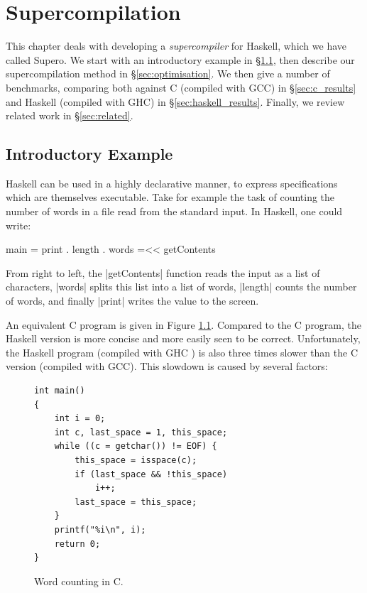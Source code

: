 
\chapter{Supercompilation}


This chapter deals with developing a \textit{supercompiler} for Haskell, which we have called Supero. We start with an introductory example in \S\ref{sec:intro_supero}, then describe our supercompilation method in \S\ref{sec:optimisation}. We then give a number of benchmarks, comparing both against C (compiled with GCC) in \S\ref{sec:c_results} and Haskell (compiled with GHC) in \S\ref{sec:haskell_results}. Finally, we review related work in \S\ref{sec:related}.

\section{Introductory Example}
\label{sec:intro_supero}

Haskell \cite{haskell} can be used in a highly declarative manner, to express specifications which are themselves executable. Take for example the task of counting the number of words in a file read from the standard input. In Haskell, one could write:

\begin{code}
main = print . length . words =<< getContents
\end{code}

From right to left, the |getContents| function reads the input as a list of characters, |words| splits this list into a list of words, |length| counts the number of words, and finally |print| writes the value to the screen.

An equivalent C program is given in Figure \ref{fig:c_words}. Compared to the C program, the Haskell version is more concise and more easily seen to be correct. Unfortunately, the Haskell program (compiled with GHC \cite{ghc}) is also three times slower than the C version (compiled with GCC). This slowdown is caused by several factors:

\begin{figure}
\begin{verbatim}
int main()
{
	int i = 0;
	int c, last_space = 1, this_space;
	while ((c = getchar()) != EOF) {
		this_space = isspace(c);
		if (last_space && !this_space)
			i++;
		last_space = this_space;
	}
	printf("%i\n", i);
	return 0;
}
\end{verbatim}
\caption{Word counting in C.}
\label{fig:c_words}
\end{figure}

